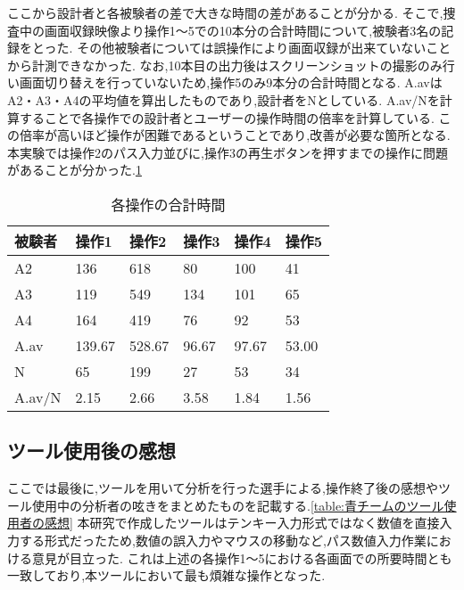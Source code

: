 \documentclass[../main.tex]{subfiles}
\begin{document}
ここから設計者と各被験者の差で大きな時間の差があることが分かる.
そこで,捜査中の画面収録映像より操作1〜5での10本分の合計時間について,被験者3名の記録をとった.
その他被験者については誤操作により画面収録が出来ていないことから計測できなかった.
なお,10本目の出力後はスクリーンショットの撮影のみ行い画面切り替えを行っていないため,操作5のみ9本分の合計時間となる.
A.avはA2・A3・A4の平均値を算出したものであり,設計者をNとしている.
A.av/Nを計算することで各操作での設計者とユーザーの操作時間の倍率を計算している.
この倍率が高いほど操作が困難であるということであり,改善が必要な箇所となる.
本実験では操作2のパス入力並びに,操作3の再生ボタンを押すまでの操作に問題があることが分かった.\ref{table:各操作時間}\\


\begin{table}[h]
  \caption{各操作の合計時間}\label{table:各操作時間}\centering
    \begin{tabular}{llllll}
    \hline \hline
    被験者 & 操作1  & 操作2 & 操作3 & 操作4 & 操作5  \\
    \hline \hline
    A2 & 136 & 618 & 80 & 100 & 41\\
    A3 & 119 & 549 & 134 & 101 & 65\\
    A4 & 164 & 419 & 76 & 92 & 53 \\
    A.av & 139.67 & 528.67 & 96.67 & 97.67 & 53.00\\
    N & 65 & 199 & 27 & 53 & 34 \\
    \hline
    A.av/N & 2.15 & 2.66 & 3.58 & 1.84 & 1.56 \\
    \hline
    \end{tabular}
  \end{table}
  










\subsection{ツール使用後の感想}

ここでは最後に,ツールを用いて分析を行った選手による,操作終了後の感想やツール使用中の分析者の呟きをまとめたものを記載する.\ref{table:青チームのツール使用者の感想}
本研究で作成したツールはテンキー入力形式ではなく数値を直接入力する形式だったため,数値の誤入力やマウスの移動など,パス数値入力作業における意見が目立った.
これは上述の各操作1〜5における各画面での所要時間とも一致しており,本ツールにおいて最も煩雑な操作となった.
\end{document}
